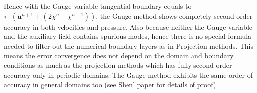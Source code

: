 Hence with the Gauge variable tangential boundary equals to $\textbf{$\tau$}\cdot\left(\textbf{u}^{n+1} + (2\chi^n - \chi^{n-1})\right)$, the Gauge method shows completely second order accuracy in both velocities and pressure. Also because neither the Gauge variable and the auxiliary field contains spurious modes, hence there is no special formula needed to filter out the numerical boundary layers as in Projection methods. This means the error convergence does not depend on the domain and boundary conditions as much as the projection methods which has fully second order accuracy only in periodic domains. The Gauge method exhibits the same order of accuracy in general domains too (see Shen' paper \cite{pyo2005normal,guermond2006overview} for details of proof).
